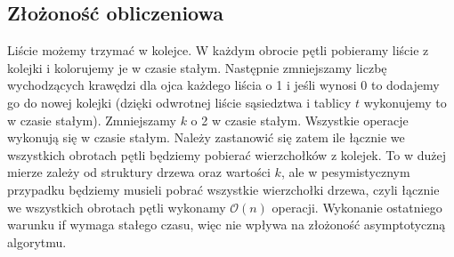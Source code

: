 \documentclass{article}
\begin{document}
\subsection{Złożoność obliczeniowa}
Liście możemy trzymać w kolejce. W każdym obrocie pętli pobieramy liście z kolejki i kolorujemy je w czasie stałym. Następnie zmniejszamy liczbę wychodzących krawędzi dla ojca każdego liścia o 1 i jeśli wynosi 0 to dodajemy go do nowej kolejki (dzięki odwrotnej liście sąsiedztwa i tablicy $t$ wykonujemy to w czasie stałym). Zmniejszamy $k$ o 2 w czasie stałym. Wszystkie operacje wykonują się w czasie stałym. Należy zastanowić się zatem ile łącznie we wszystkich obrotach pętli będziemy pobierać wierzchołków z kolejek. To w dużej mierze zależy od struktury drzewa oraz wartości $k$, ale w pesymistycznym przypadku będziemy musieli pobrać wszystkie wierzchołki drzewa, czyli łącznie we wszystkich obrotach pętli wykonamy $\mathcal{O}(n)$ operacji. Wykonanie ostatniego warunku if wymaga stałego czasu, więc nie wpływa na złożoność asymptotyczną algorytmu.
\end{document}
